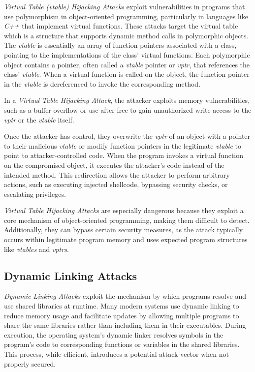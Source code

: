 \textit{Virtual Table (vtable) Hijacking Attacks} exploit vulnerabilities in programs
that use polymorphism in object-oriented programming, particularly in languages
like \textit{C++} that implement virtual functions. These attacks target the
virtual table which is a structure that supports dynamic method calls in
polymorphic objects. The \textit{vtable} is essentially an array of function
pointers associated with a class, pointing to the implementations of the class'
virtual functions. Each polymorphic object contains a pointer, often called a
\textit{vtable} pointer or \textit{vptr}, that references the class' \textit{vtable}.
When a virtual function is called on the object, the function pointer in the \textit{vtable}
is dereferenced to invoke the corresponding method.

In a \textit{Virtual Table Hijacking Attack}, the attacker exploits memory
vulnerabilities, such as a buffer overflow or use-after-free to gain unauthorized
write access to the \textit{vptr} or the \textit{vtable} itself.

Once the attacker has control, they overwrite the \textit{vptr} of an object with
a pointer to their malicious \textit{vtable} or modify function pointers in the
legitimate \textit{vtable} to point to attacker-controlled code. When the
program invokes a virtual function on the compromised object, it executes the attacker's
code instead of the intended method. This redirection allows the attacker to
perform arbitrary actions, such as executing injected shellcode, bypassing
security checks, or escalating privileges.

\textit{Virtual Table Hijacking Attacks} are especially dangerous because they
exploit a core mechanism of object-oriented programming, making them difficult to
detect. Additionally, they can bypass certain security measures, as the attack
typically occurs within legitimate program memory and uses expected program
structures like \textit{vtables} and \textit{vptrs}.

\subsection{Dynamic Linking Attacks}
\label{subsec:background_dynamiclinking}

\textit{Dynamic Linking Attacks} exploit the mechanism by which programs resolve
and use shared libraries at runtime. Many modern systems use dynamic linking to reduce
memory usage and facilitate updates by allowing multiple programs to share the same
libraries rather than including them in their executables. During execution, the
operating system's dynamic linker resolves symbols in the program's code to corresponding
functions or variables in the shared libraries. This process, while efficient,
introduces a potential attack vector when not properly secured.

